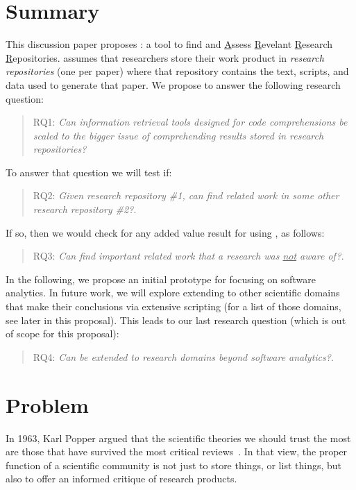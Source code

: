 \documentclass[journal]{IEEEtran}
\begin{document}
\section{Summary}
This discussion paper proposes {\IT}: a tool to find and \underline{A}ssess
\underline{R}evelant \underline{R}esearch \underline{R}epositories.
{\IT} assumes that researchers store their work product in
{\em research repositories}
(one per paper) where that repository contains the text, scripts, and data used
to generate that paper. 
We propose {\IT} to answer the following research question:
\begin{quote}
RQ1: {\em Can information retrieval tools designed for 
code comprehensions be scaled
to the bigger issue of comprehending  results
stored in research repositories?}
\end{quote}
To answer that question we will test if:
\begin{quote}
RQ2: {\em Given research repository \#1, can  {\IT} find related work in some other
research repository \#2?}.
\end{quote}
If so, then we would check for any added value result for using {\IT}, as follows:
\begin{quote}
RQ3: {\em Can {\IT} find important related work that a research was \underline{not}
aware of?}.
\end{quote}
In the following, we propose an initial prototype for {\IT} focusing on 
software analytics. In future work, we will  explore extending {\IT} to other
scientific domains that make their conclusions via extensive
scripting (for a list of those domains, see later in this proposal). This leads to our last research question (which is out of scope for this
proposal): 
\begin{quote}
RQ4: {\em Can {\IT} be extended to research domains beyond software analytics?}.
\end{quote}
 





\section{Problem}
In 1963,  Karl Popper 
argued that the scientific theories
we should trust the most are those that have survived the most critical
reviews~\cite{popper63}. In that view, the proper function of a scientific
community
is  not just to store things, or list things, but also
to offer an informed critique of research products.  
 
\end{document}
